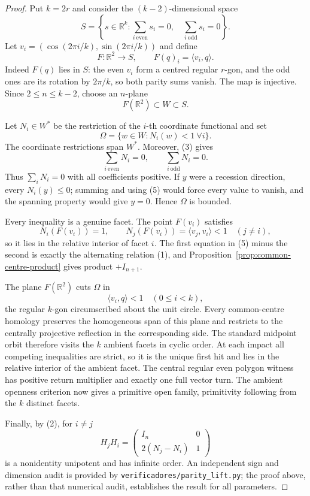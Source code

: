 \documentclass[11pt,a4paper]{article}
\theoremstyle{plain}
\theoremstyle{definition}
\theoremstyle{remark}
\begin{document}
\begin{proof}
Put $k=2r$ and consider the $(k-2)$-dimensional space
\[
 S=\left\{s\in\mathbb R^k:
       \sum_{i\ \mathrm{even}}s_i=0,\quad
       \sum_{i\ \mathrm{odd}}s_i=0\right\}.               \tag{3}
\]
Let $v_i=(\cos(2\pi i/k),\sin(2\pi i/k))$ and define
\[
 F:\mathbb R^2\longrightarrow S,\qquad F(q)_i=\langle v_i,q\rangle .
\]
Indeed $F(q)$ lies in $S$: the even $v_i$ form a centred regular $r$-gon, and
the odd ones are its rotation by $2\pi/k$, so both parity sums vanish.  The map is
injective.  Since $2\le n\le k-2$, choose an $n$-plane
\[
                         F(\mathbb R^2)\subset W\subset S.  \tag{4}
\]

Let $N_i\in W^*$ be the restriction of the $i$-th coordinate functional and set
\[
                         \Omega=\{w\in W:N_i(w)<1\ \forall i\}.
\]
The coordinate restrictions span $W^*$.  Moreover, (3) gives
\[
             \sum_{i\ \mathrm{even}}N_i=0,
             \qquad \sum_{i\ \mathrm{odd}}N_i=0.          \tag{5}
\]
Thus $\sum_iN_i=0$ with all coefficients positive.  If $y$ were a recession
direction, every $N_i(y)\le0$; summing and using (5) would force every value to
vanish, and the spanning property would give $y=0$.  Hence $\Omega$ is bounded.

Every inequality is a genuine facet.  The point $F(v_i)$ satisfies
\[
 N_i(F(v_i))=1,
 \qquad N_j(F(v_i))=\langle v_j,v_i\rangle<1\quad(j\ne i),
\]
so it lies in the relative interior of facet $i$.  The first equation in (5)
minus the second is exactly the alternating relation (1), and
Proposition~\ref{prop:common-centre-product} gives product $+I_{n+1}$.

The plane $F(\mathbb R^2)$ cuts $\Omega$ in
\[
                         \langle v_i,q\rangle<1\quad(0\le i<k),
\]
the regular $k$-gon circumscribed about the unit circle.  Every common-centre
homology preserves the homogeneous span of this plane and restricts to the
centrally projective reflection in the corresponding side.  The standard
midpoint orbit therefore visits the $k$ ambient facets in cyclic order.  At each
impact all competing inequalities are strict, so it is the unique first hit and
lies in the relative interior of the ambient facet.  The central regular even
polygon witness has positive return multiplier and exactly one full vector turn.
The ambient openness criterion now gives a primitive open family, primitivity
following from the $k$ distinct facets.

Finally, by (2), for $i\ne j$
\[
 H_jH_i=\begin{pmatrix}I_n&0\\2(N_j-N_i)&1\end{pmatrix}
\]
is a nonidentity unipotent and has infinite order.  An independent sign and
dimension audit is provided by
\texttt{verificadores/}\allowbreak\texttt{parity\_lift.py}; the proof above,
rather than that numerical audit, establishes the result for all parameters.
\end{proof}
\end{document}
